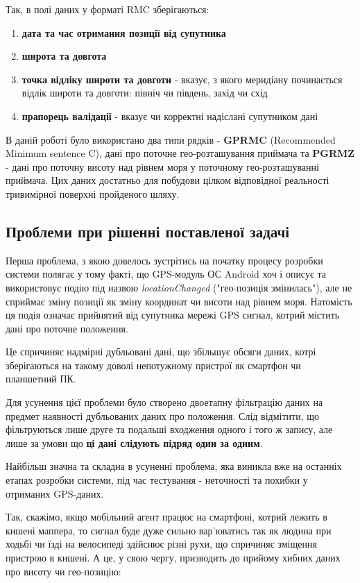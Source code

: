 \documentclass[simple,a4paper,14pt,ukrainian,utf8]{eskdtext}
\begin{document}
    Так, в полі даних у форматі RMC зберігаються:
    
    \begin{enumerate}
    	\item \textbf{дата та час отримання позиції від супутника}
    	\item \textbf{широта та довгота}
    	\item \textbf{точка відліку широти та довготи} - вказує, з якого меридіану починається відлік широти та довготи: північ чи південь, захід чи схід
    	\item \textbf{прапорець валідації} - вказує чи корректні надіслані супутником дані
    \end{enumerate}
    
    В даній роботі було використано два типи рядків - \textbf{GPRMC} (Recommended Minimum sentence C), дані про поточне гео-розташування приймача та \textbf{PGRMZ} - дані про поточну висоту над рівнем моря у поточному гео-розташуванні приймача. Цих даних достатньо для побудови цілком відповідної реальності тривимірної поверхні пройденого шляху.

	\subsection{Проблеми при рішенні поставленої задачі}
	
	Перша проблема, з якою довелось зустрітись на початку процесу розробки системи полягає у тому факті, що GPS-модуль ОС Android хоч і описує та використовує подію під назвою \textit{locationChanged} ("гео-позиція змінилась"), але не сприймає зміну позиції як зміну координат чи висоти над рівнем моря. Натомість ця подія означає прийнятий від супутника мережі GPS сигнал, котрий містить дані про поточне положення. 
	
	Це спричиняє надмірні дубльовані дані, що збільшує обсяги даних, котрі зберігаються на такому доволі непотужному пристрої як смартфон чи планшетний ПК. 
	
	Для усунення цієї проблеми було створено двоетапну фільтрацію даних на предмет наявності дубльованих даних про положення. Слід відмітити, що фільтруються лише друге та подальші входження одного і того ж запису, але лише за умови що \textbf{ці дані слідують підряд один за одним}.
	
	Найбільш значна та складна в усуненні проблема, яка виникла вже на останніх етапах розробки системи, під час тестування - неточності та похибки у отриманих GPS-даних.
	
	Так, скажімо, якщо мобільний агент працює на смартфоні, котрий лежить в кишені маппера, то сигнал буде дуже сильно вар’юватись так як людина при ходьбі чи їзді на велосипеді здійснює різні рухи, що спричиняє зміщення пристрою в кишені. А це, у свою чергу, призводить до прийому хибних даних про висоту чи гео-позицію:
	
\end{document}

